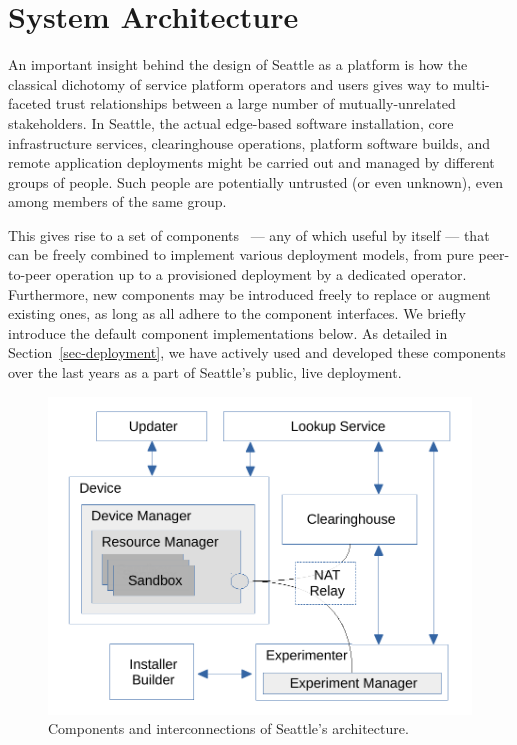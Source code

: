 \section{System Architecture}

An important insight behind the design of Seattle as a platform
is how the classical
dichotomy of service platform operators and users gives way to multi-faceted
trust relationships between a large number of mutually-unrelated
stakeholders.
In Seattle, the actual edge-based software installation, core infrastructure
services, clearinghouse operations, platform software builds, and remote
application deployments might be carried out and managed by different
groups of people. Such people are potentially untrusted (or even unknown),
even among members of the same group.

This gives rise to a set of components~\cite{Cappos2009} ---
any of which useful
by itself --- that can be freely combined to implement various
deployment models, from pure peer-to-peer operation up to a
provisioned deployment by a dedicated operator. Furthermore,
new components may be introduced freely to replace or augment
existing ones, as long as all adhere to the component interfaces.
We briefly introduce the default component implementations below.
As detailed in Section~\ref{sec-deployment}, we have actively used
and developed these components over the last years as a part of
Seattle's public, live deployment.

\begin{figure}
  \centering
  \includegraphics[width=\columnwidth]{figures/components.pdf}
  \caption{Components and interconnections of Seattle's architecture.}
  \label{fig:arch}
\end{figure}


